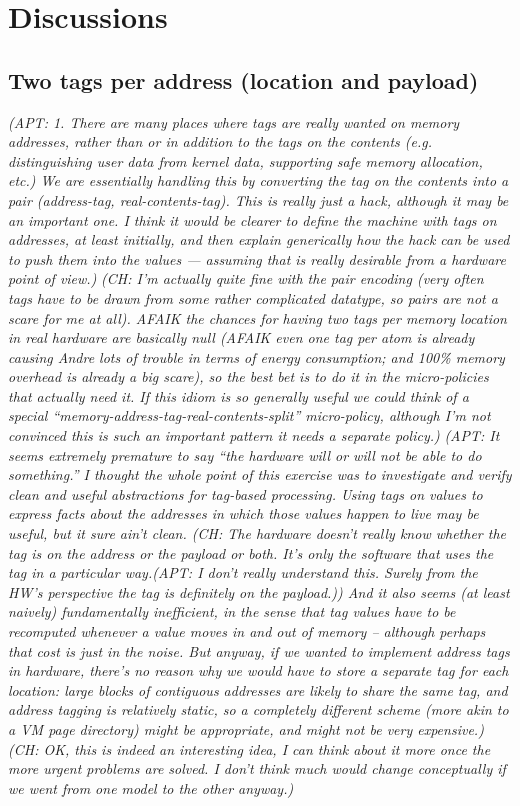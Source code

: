 \documentclass{article}
\newcommand{\ch}[1]{{\color{dkblue}\em (CH: #1)}}
\newcommand{\apt}[1]{{\color{red}\em (APT: #1)}}
\begin{document}
\section{Discussions}

\subsection{Two tags per address (location and payload)}

\apt{1. There are many places where tags are really wanted on memory addresses,
rather than or in addition to the tags on the contents (e.g. distinguishing
user data from kernel data, supporting safe memory allocation, etc.)  We are
essentially handling this by converting the tag on the contents into a pair
(address-tag, real-contents-tag).  This is really just a hack, although it
may be an important one. I think it would be clearer to define the machine with
tags on addresses, at least initially, and then explain generically how
the hack can be used to push them into the values --- assuming that is really
desirable from a hardware point of view.}
\ch{I'm actually quite fine with the pair encoding (very often tags
  have to be drawn from some rather complicated datatype, so pairs are
  not a scare for me at all). AFAIK the chances for having two tags
  per memory location in real hardware are basically null (AFAIK even
  one tag per atom is already causing Andre lots of trouble in terms
  of energy consumption; and 100\% memory overhead is already a big
  scare), so the best bet is to do it in the micro-policies that
  actually need it. If this idiom is so generally useful we could
  think of a special ``memory-address-tag-real-contents-split''
  micro-policy, although I'm not convinced this is such an important
  pattern it needs a separate policy.}
\apt{It seems extremely premature to say ``the hardware will or will
not be able to do something.''  I thought the whole point of this exercise
was to investigate and verify clean and useful abstractions for tag-based processing.
Using tags on values to express facts about the addresses in which those
values happen to live may be useful, but it sure ain't clean.
\ch{The hardware doesn't really know whether the tag is on the
  address or the payload or both. It's only the software that
  uses the tag in a particular way.\apt{I don't really understand this.
  Surely from the HW's perspective the tag is definitely on 
  the payload.}}
And it also seems (at least naively) fundamentally inefficient, 
in the sense that tag values have to be recomputed whenever a value moves
in and out of memory -- although perhaps that cost is just in the noise.
But anyway, if we wanted to implement address tags in hardware, there's no reason why
we would have to store a separate tag for each location: large blocks of
contiguous addresses are likely to share the same tag, and address tagging
is relatively static, so a completely different scheme (more akin to a VM page 
directory) might be appropriate, and might not be very expensive.}
\ch{OK, this is indeed an interesting idea, I can think about it more once
  the more urgent problems are solved. I don't think much would change
  conceptually if we went from one model to the other anyway.}
\end{document}
